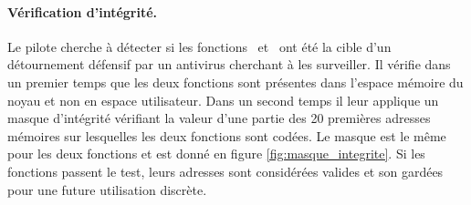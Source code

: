 \paragraph{Vérification d'intégrité.}
Le pilote cherche à détecter si les fonctions \ZwA\ et \ZwP\ ont été la cible d'un détournement défensif par un antivirus cherchant à les surveiller.
Il vérifie dans un premier temps que les deux fonctions sont présentes dans l'espace mémoire du noyau et non en espace utilisateur.
Dans un second temps il leur applique un masque d'intégrité vérifiant la valeur d'une partie des 20 premières adresses mémoires sur lesquelles les deux fonctions sont codées. Le masque est le même pour les deux fonctions et est donné en figure \ref{fig:masque_integrite}.
Si les fonctions passent le test, leurs adresses sont considérées valides et son gardées pour une future utilisation discrète.


